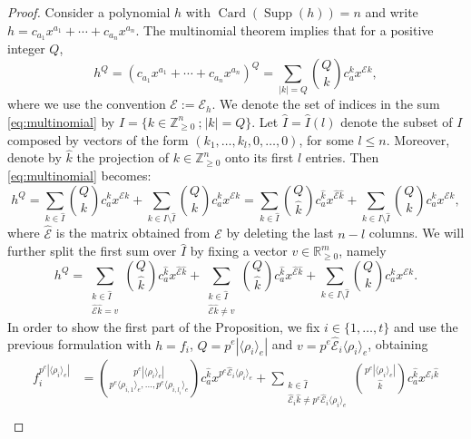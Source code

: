 \documentclass[12pt]{amsart}
\theoremstyle{definition}
\numberwithin{equation}{subsection}
\newcommand{\ZZ}{\mathbb{Z}}
\newcommand{\RR}{\mathbb{R}}
\newcommand{\Card}{\operatorname{Card}}
\newcommand{\E}{\mathcal{E}}
\newcommand{\tE}{\operatorname{\widehat{\E}}}
\newcommand{\Supp}{\operatorname{Supp}}
\renewcommand{\!}[1]{{\color{red}\text{\Huge$\star$ }#1}}
\begin{document}
\begin{proof}
	Consider a polynomial $h$ with $\Card(\Supp(h))=n$ and write $h=c_{a_{1}}x^{a_{1}}+\cdots+c_{a_{n}}x^{a_{n}}$. The multinomial theorem implies that for a positive integer $Q$,
	\begin{equation}\label{eq:multinomial}
		h^Q=(c_{a_{1}}x^{a_{1}}+\cdots+c_{a_{n}}x^{a_{n}})^Q=\sum_{|k|=Q} \binom{Q}{k}c_{a}^k x^{\E k},
	\end{equation}
	where we use the convention $\E:=\E_h$. We denote the set of indices in the sum \eqref{eq:multinomial} by $I=\{k\in \ZZ_{\geq 0}^{n}\ \text{;}\ |k|=Q\}$. Let $\widehat{I}=\widehat{I}(l)$ denote the subset of $I$ composed by vectors of the form $(k_1,\ldots,k_{l},0,\ldots,0)$, for some $l\leq n$. Moreover, denote by $\hat{k}$ the projection of $k \in \ZZ_{\geq 0}^{n}$ onto its first $l$ entries. Then \eqref{eq:multinomial} becomes:
	\begin{equation*}
			h^Q=\sum_{k\in \widehat{I}} \binom{Q}{k}c_{a}^k x^{\E k}+\sum_{k\in I\setminus \widehat{I}} \binom{Q}{k}c_{a}^k x^{\E k}
			=\sum_{k\in \widehat{I}} \binom{Q}{\hat{k}}c_{a}^{\hat{k}} x^{\tE \hat{k}}+\sum_{k\in I\setminus \widehat{I}} \binom{Q}{k}c_{a}^k x^{\E k},
	\end{equation*}
	where $\tE$ is the matrix obtained from $\E$ by deleting the last $n-l$ columns. We will further split the first sum over $\widehat{I}$ by fixing a vector $v\in \RR_{\geq 0}^m$, namely
	\begin{equation*}
		h^Q
		=\sum_{\substack{k\in \widehat{I}\\\tE \hat{k}=v}} \binom{Q}{\hat{k}}c_{a}^{\hat{k}} x^{\tE \hat{k}}+\sum_{\substack{k\in \widehat{I}\\\tE \hat{k}\neq v}} \binom{Q}{\hat{k}}c_{a}^{\hat{k}} x^{\tE \hat{k}}+\sum_{k\in I\setminus \widehat{I}} \binom{Q}{k}c_{a}^k x^{\E k}.
	\end{equation*}
	In order to show the first part of the Proposition, we fix $i\in\{1,\ldots,t\}$ and use the previous formulation with $h=f_i$, $Q=p^e|\langle \rho_i \rangle_e|$ and $v=p^{e}\tE_i \langle \rho_i \rangle_e$, obtaining   
	\begin{align*}		
		f_i^{p^{e}|\langle \rho_i \rangle_e|}
		&=\binom{p^{e}|\langle \rho_i \rangle_e|}{p^{e}\langle \rho_{i,1} \rangle_e,\ldots,p^{e}\langle \rho_{i,l_i} \rangle_e}
		c_{a}^{\hat{k}}x^{p^{e}\tE_i \langle \rho_i \rangle_e}+\sum_{\substack{k\in \widehat{I}\\\tE_{i}\hat{k}\neq p^e\tE_{i}\langle \rho_i \rangle_e}}  \binom{p^{e}|\langle \rho_i \rangle_e|}{\hat{k}}c_{a}^{\hat{k}} x^{\tE_{i} \hat{k}}\\

\end{align*}
\end{proof}
\end{document}
